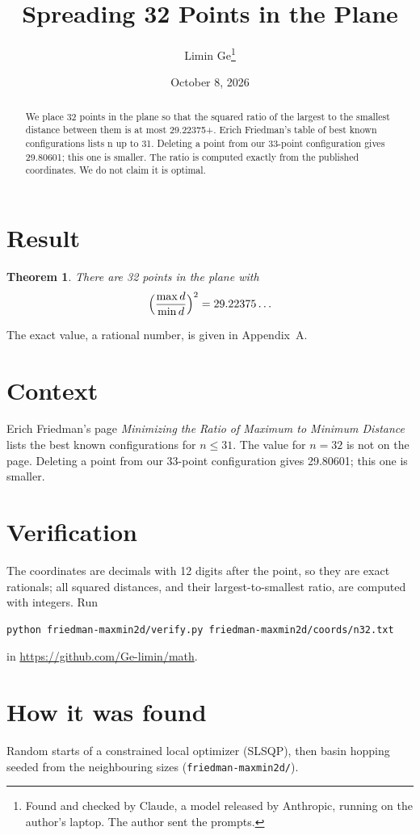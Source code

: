 \documentclass[11pt,a4paper]{article}
\title{Spreading 32 Points in the Plane}
\author{Limin Ge\thanks{Found and checked by Claude, a model released by Anthropic, running on the author's laptop. The author sent the prompts.}}
\date{October 8, 2026}
\newtheorem*{theorem}{Theorem}
\begin{document}
\maketitle
\begin{abstract}
We place 32 points in the plane so that the squared ratio of the largest to the smallest distance between them is at most 29.22375+. Erich Friedman's table of best known configurations lists n up to 31. Deleting a point from our 33-point configuration gives 29.80601; this one is smaller. The ratio is computed exactly from the published coordinates. We do not claim it is optimal.
\end{abstract}

\section{Result}
\begin{theorem}
There are 32 points in the plane with
\[ \Bigl(\frac{\max d}{\min d}\Bigr)^2 = 29.22375\ldots \]
\end{theorem}
The exact value, a rational number, is given in Appendix~A.


\section{Context}
Erich Friedman's page \emph{Minimizing the Ratio of Maximum to Minimum Distance} lists the best known configurations for $n\le 31$. The value for $n=32$ is not on the page. Deleting a point from our 33-point configuration gives 29.80601; this one is smaller.


\section{Verification}
The coordinates are decimals with 12 digits after the point, so they are exact rationals; all squared distances, and their largest-to-smallest ratio, are computed with integers. Run
\begin{verbatim}
python friedman-maxmin2d/verify.py friedman-maxmin2d/coords/n32.txt
\end{verbatim}
in \url{https://github.com/Ge-limin/math}.


\section{How it was found}
Random starts of a constrained local optimizer (SLSQP), then basin hopping seeded from the neighbouring sizes (\texttt{friedman-maxmin2d/}).
\end{document}
